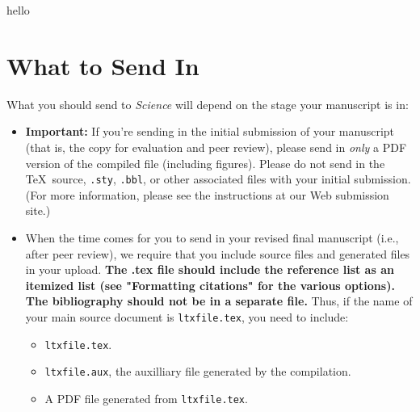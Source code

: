 \documentclass[12pt]{article}
\begin{document}
hello \cite{menges2000applications}





\section*{What to Send In}

What you should send to {\it Science\/} will depend on the stage your manuscript is in:

\begin{itemize}
\item {\bf Important:} If you're sending in the initial submission of
  your manuscript (that is, the copy for evaluation and peer review),
  please send in {\it only\/} a PDF version of the
  compiled file (including figures).  Please do not send in the \TeX\ 
  source, \texttt{.sty}, \texttt{.bbl}, or other associated files with
  your initial submission.  (For more information, please see the
  instructions at our Web submission site.)
\item When the time comes for you to send in your revised final
  manuscript (i.e., after peer review), we require that you include
   source files and generated files in your upload. {\bf The .tex file should include
the reference list as an itemized list (see "Formatting citations"  for the various options). The bibliography should not be in a separate file.}  
  Thus, if the
  name of your main source document is \texttt{ltxfile.tex}, you
  need to include:
\begin{itemize}
\item \texttt{ltxfile.tex}.
\item \texttt{ltxfile.aux}, the auxilliary file generated by the
  compilation.
\item A PDF file generated from
  \texttt{ltxfile.tex}.

\end{itemize}
\end{itemize}


\end{document}
